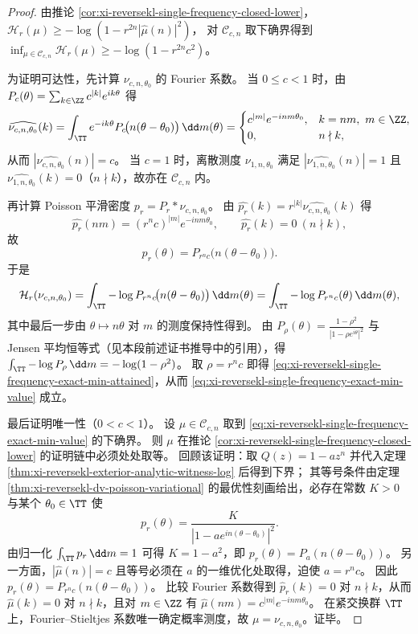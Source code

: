 \begin{proof}
由推论 \ref{cor:xi-reversekl-single-frequency-closed-lower}，
\(
\mathcal H_r(\mu)\ge -\log(1-r^{2n}|\widehat\mu(n)|^2)
\)，
对 \(\mathcal C_{c,n}\) 取下确界得到
\(
\inf_{\mu\in\mathcal C_{c,n}}\mathcal H_r(\mu)\ge -\log(1-r^{2n}c^2)
\)。

为证明可达性，先计算 \(\nu_{c,n,\theta_0}\) 的 Fourier 系数。
当 \(0\le c<1\) 时，由 \(P_c(\theta)=\sum_{k\in\ZZ}c^{|k|}e^{ik\theta}\) 得
\[
\widehat{\nu_{c,n,\theta_0}}(k)
=\int_{\TT}e^{-ik\theta}P_c\!\bigl(n(\theta-\theta_0)\bigr)\,\dd m(\theta)
=
\begin{cases}
c^{|m|}e^{-inm\theta_0},& k=nm,\ m\in\ZZ,\\
0,& n\nmid k,
\end{cases}
\]
从而 \(|\widehat{\nu_{c,n,\theta_0}}(n)|=c\)。
当 \(c=1\) 时，离散测度 \(\nu_{1,n,\theta_0}\) 满足 \(|\widehat{\nu_{1,n,\theta_0}}(n)|=1\) 且 \(\widehat{\nu_{1,n,\theta_0}}(k)=0\)（\(n\nmid k\)），故亦在 \(\mathcal C_{c,n}\) 内。

再计算 Poisson 平滑密度 \(p_r=P_r*\nu_{c,n,\theta_0}\)。
由 \(\widehat{p_r}(k)=r^{|k|}\widehat{\nu_{c,n,\theta_0}}(k)\) 得
\[
\widehat{p_r}(nm)=(r^n c)^{|m|}e^{-inm\theta_0},\qquad \widehat{p_r}(k)=0\ (n\nmid k),
\]
故
\[
p_r(\theta)=P_{r^n c}\!\bigl(n(\theta-\theta_0)\bigr).
\]
于是
\[
\mathcal H_r(\nu_{c,n,\theta_0})
=\int_{\TT}-\log P_{r^n c}\!\bigl(n(\theta-\theta_0)\bigr)\,\dd m(\theta)
=\int_{\TT}-\log P_{r^n c}(\theta)\,\dd m(\theta),
\]
其中最后一步由 \(\theta\mapsto n\theta\) 对 \(m\) 的测度保持性得到。
由 \(P_\rho(\theta)=\frac{1-\rho^2}{|1-\rho e^{i\theta}|^2}\) 与 Jensen 平均恒等式（见本段前述证书推导中的引用），得
\(
\int_{\TT}-\log P_\rho\,\dd m=-\log(1-\rho^2)
\)。
取 \(\rho=r^n c\) 即得 \eqref{eq:xi-reversekl-single-frequency-exact-min-attained}，从而 \eqref{eq:xi-reversekl-single-frequency-exact-min-value} 成立。

最后证明唯一性（\(0<c<1\)）。
设 \(\mu\in\mathcal C_{c,n}\) 取到 \eqref{eq:xi-reversekl-single-frequency-exact-min-value} 的下确界。
则 \(\mu\) 在推论 \ref{cor:xi-reversekl-single-frequency-closed-lower} 的证明链中必须处处取等。
回顾该证明：取 \(Q(z)=1-a z^n\) 并代入定理 \ref{thm:xi-reversekl-exterior-analytic-witness-log} 后得到下界；
其等号条件由定理 \ref{thm:xi-reversekl-dv-poisson-variational} 的最优性刻画给出，必存在常数 \(K>0\) 与某个 \(\theta_0\in\TT\) 使
\[
p_r(\theta)=\frac{K}{|1-ae^{in(\theta-\theta_0)}|^2}.
\]
由归一化 \(\int_{\TT}p_r\,\dd m=1\) 可得 \(K=1-a^2\)，即
\(
p_r(\theta)=P_a(n(\theta-\theta_0))
\)。
另一方面，\(|\widehat\mu(n)|=c\) 且等号必须在 \(a\) 的一维优化处取得，迫使 \(a=r^n c\)。
因此
\(
p_r(\theta)=P_{r^n c}(n(\theta-\theta_0))
\)。
比较 Fourier 系数得到 \(\widehat p_r(k)=0\) 对 \(n\nmid k\)，从而 \(\widehat\mu(k)=0\) 对 \(n\nmid k\)，且对 \(m\in\ZZ\) 有
\(
\widehat\mu(nm)=c^{|m|}e^{-inm\theta_0}
\)。
在紧交换群 \(\TT\) 上，Fourier--Stieltjes 系数唯一确定概率测度，故 \(\mu=\nu_{c,n,\theta_0}\)。证毕。
\end{proof}

